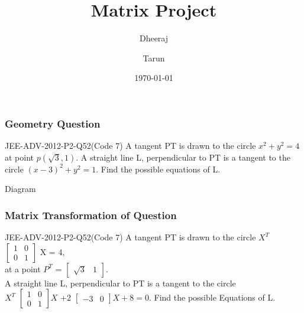 \documentclass{beamer}
\title[Project]{Matrix Project} %
\author{Dheeraj\and Tarun} %
\institute[IITH] %
{
IITH\\ %
\medskip
\textit{ee17btech11033@iith.ac.in \and ee17btech11042@iith.ac.in} %
}
\date{\today} %
\begin{document}
\begin{frame}
\titlepage %
\end{frame}


\begin{frame}
\frametitle{Geometry Question}
\begin{block}{JEE-ADV-2012-P2-Q52(Code 7)}
A tangent PT is drawn to the circle $x^{2} + y^{2} = 4$ at point $p(\sqrt{3},1)$. A straight line L,
perpendicular to PT is a tangent to the circle $(x-3)^{2} + y^{2} = 1$. Find the possible equations of L.
\end{block}
\end{frame}

\begin{frame}{Diagram}
\end{frame}

\begin{frame}
\frametitle{Matrix Transformation of Question}
\begin{block}{JEE-ADV-2012-P2-Q52(Code 7)}
A tangent PT is drawn to the circle
$X^{T}$ $\begin{bmatrix}
    1 & 0 \\
    0 & 1
\end{bmatrix}$ X = 4, 
\\at a point $P^{T}$ = 
$\begin{bmatrix}
\sqrt{3} & 1
\end{bmatrix}$.
\\A straight line L,  perpendicular to PT is a tangent to the circle 
\\$X^{T}$
$\begin{bmatrix}
1 & 0 \\ 0 & 1
\end{bmatrix}X$ +2
$\begin{bmatrix}
-3 & 0
\end{bmatrix}X+8=0.
$
\newline Find the possible Equations of L.
\end{block}
\end{frame}
\end{document}
